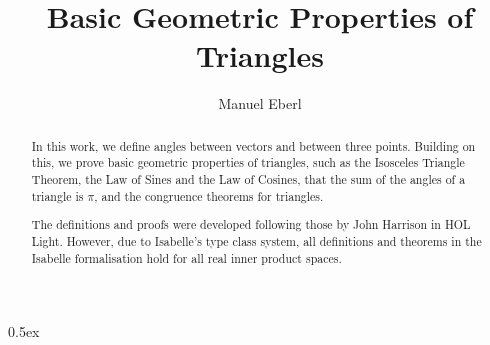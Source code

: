 \documentclass[11pt,a4paper]{article}
\begin{document}
\title{Basic Geometric Properties of Triangles}
\author{Manuel Eberl}
\maketitle

\begin{abstract}
In this work, we define angles between vectors and between three points. Building on this, we prove basic geometric properties of triangles, such as the Isosceles Triangle Theorem, the Law of Sines and the Law of Cosines, that the sum of the angles of a triangle is $\pi$, and the congruence theorems for triangles.

The definitions and proofs were developed following those by John Harrison in HOL Light. However, due to Isabelle's type class system, all definitions and theorems in the Isabelle formalisation hold for all real inner product spaces.
\end{abstract}

\tableofcontents

\parindent 0pt\parskip 0.5ex



\nocite{*}


\end{document}
